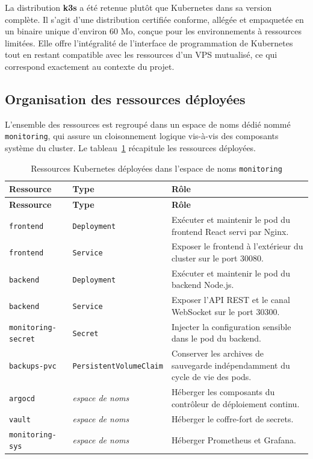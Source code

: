 La distribution \textbf{k3s} a été retenue plutôt que Kubernetes dans sa version
complète. Il s'agit d'une distribution certifiée conforme, allégée et empaquetée en un
binaire unique d'environ 60 Mo, conçue pour les environnements à ressources limitées.
Elle offre l'intégralité de l'interface de programmation de Kubernetes tout en restant
compatible avec les ressources d'un VPS mutualisé, ce qui correspond exactement au
contexte du projet.

\subsection{Organisation des ressources déployées}
L'ensemble des ressources est regroupé dans un espace de noms dédié nommé
\texttt{monitoring}, qui assure un cloisonnement logique vis-à-vis des composants
système du cluster. Le tableau~\ref{tab:k8s-res} récapitule les ressources déployées.

\renewcommand{\arraystretch}{1.3}
\small
\begin{longtable}{|>{\raggedright\arraybackslash}p{3.4cm}
                  |>{\raggedright\arraybackslash}p{3.0cm}
                  |>{\raggedright\arraybackslash}p{7.0cm}|}
\hline
\textbf{Ressource} & \textbf{Type} & \textbf{Rôle} \\
\hline
\endfirsthead

\hline
\textbf{Ressource} & \textbf{Type} & \textbf{Rôle} \\
\hline
\endhead

\hline
\caption{Ressources Kubernetes déployées dans l'espace de noms \texttt{monitoring}}
\label{tab:k8s-res}
\endlastfoot

\texttt{frontend} & \texttt{Deployment} & Exécuter et maintenir le pod du frontend React servi par Nginx. \\
\hline
\texttt{frontend} & \texttt{Service} & Exposer le frontend à l'extérieur du cluster sur le port 30080. \\
\hline
\texttt{backend} & \texttt{Deployment} & Exécuter et maintenir le pod du backend Node.js. \\
\hline
\texttt{backend} & \texttt{Service} & Exposer l'API REST et le canal WebSocket sur le port 30300. \\
\hline
\texttt{monitoring-secret} & \texttt{Secret} & Injecter la configuration sensible dans le pod du backend. \\
\hline
\texttt{backups-pvc} & \texttt{Persistent}\allowbreak\texttt{VolumeClaim} & Conserver les archives de sauvegarde indépendamment du cycle de vie des pods. \\
\hline
\texttt{argocd} & \textit{espace de noms} & Héberger les composants du contrôleur de déploiement continu. \\
\hline
\texttt{vault} & \textit{espace de noms} & Héberger le coffre-fort de secrets. \\
\hline
\texttt{monitoring-sys} & \textit{espace de noms} & Héberger Prometheus et Grafana. \\
\hline

\end{longtable}
\normalsize

